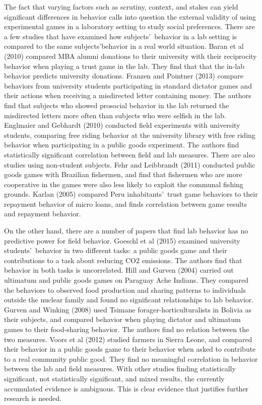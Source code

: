 \documentclass{article}
\begin{document}
The fact that varying factors such as scrutiny, context, and stakes can yield significant differences in behavior calls into question the external validity of using experimental games in a laboratory setting to study social preferences. There are a few studies that have examined how subjects\rq \ behavior in a lab setting is compared to the same subjects\rq  behavior in a real world situation. Baran et al (2010) compared MBA alumni donations to their university with their reciprocity behavior when playing a trust game in the lab. They find that that the in-lab behavior predicts university donations. Franzen and Pointner (2013) compare behaviors from university students participating in standard dictator games and their actions when receiving a misdirected letter containing money. The authors find that subjects who showed prosocial behavior in the lab returned the misdirected letters more often than subjects who were selfish in the lab. Englmaier and Gebhardt (2010) conducted field experiments with university students, comparing free riding behavior at the university library with free riding behavior when participating in a public goods experiment. The authors find statistically significant correlation between field and lab measures. There are also studies using non-student subjects. Fehr and Leibbrandt (2011) conducted public goods games with Brazilian fishermen, and find that fishermen who are more cooperative in the games were also less likely to exploit the communal fishing grounds. Karlan (2005) compared Peru inhabitants\rq  \ trust game behaviors to their repayment behavior of micro loans, and finds correlation between game results and repayment behavior. 

On the other hand, there are a number of papers that find lab behavior has no predictive power for field behavior. Goeschl et al (2015) examined university students\rq \ behavior in two different tasks: a public goods game and their contributions to a task about reducing CO2 emissions. The authors find that behavior in both tasks is uncorrelated. Hill and Gurven (2004) carried out ultimatum and public goods games on Paraguay Ache Indians. They compared the behaviors to observed food production and sharing patterns to individuals outside the nuclear family and found no significant relationships to lab behavior. Gurven and Winking (2008) used Tsimane forager-horticulturalists in Bolivia as their subjects, and compared behavior when playing dictator and ultimatum games to their food-sharing behavior. The authors find no relation between the two measures. Voors et al (2012) studied farmers in Sierra Leone, and compared their behavior in a public goods game to their behavior when asked to contribute to a real community public good. They find no meaningful correlation in behavior between the lab and field measures. With other studies finding statistically significant, not statistically significant, and mixed results, the currently accumulated evidence is ambiguous. This is clear evidence that justifies further research is needed. 
\end{document}
